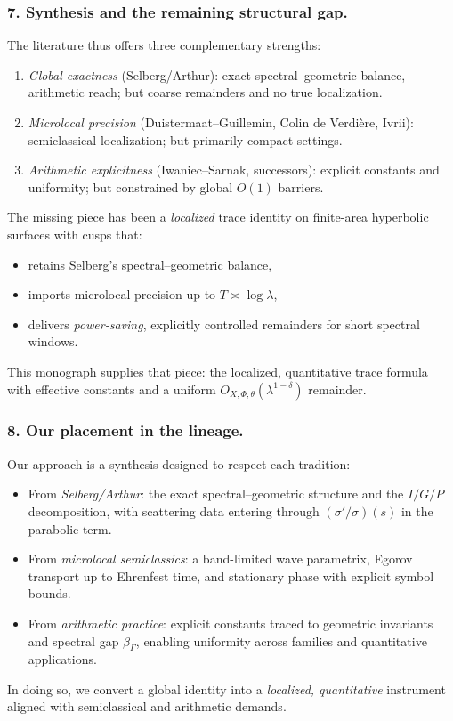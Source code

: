 \medskip

\subsubsection*{7. Synthesis and the remaining structural gap.}
The literature thus offers three complementary strengths:
\begin{enumerate}[label=\alph*)]
  \item \emph{Global exactness} (Selberg/Arthur): exact spectral–geometric balance, arithmetic reach; but coarse remainders and no true localization.
  \item \emph{Microlocal precision} (Duistermaat–Guillemin, Colin de Verdière, Ivrii): semiclassical localization; but primarily compact settings.
  \item \emph{Arithmetic explicitness} (Iwaniec–Sarnak, successors): explicit constants and uniformity; but constrained by global $O(1)$ barriers.
\end{enumerate}
The missing piece has been a \emph{localized} trace identity on finite-area hyperbolic surfaces with cusps that:
\begin{itemize}
  \item retains Selberg’s spectral–geometric balance,
  \item imports microlocal precision up to $T\asymp\log\lambda$,
  \item delivers \emph{power-saving}, explicitly controlled remainders for short spectral windows.
\end{itemize}
This monograph supplies that piece: the localized, quantitative trace formula with effective constants and a uniform
$O_{X,\Phi,\theta}(\lambda^{1-\delta})$ remainder.

\medskip

\subsubsection*{8. Our placement in the lineage.}
Our approach is a synthesis designed to respect each tradition:
\begin{itemize}
  \item From \emph{Selberg/Arthur}: the exact spectral–geometric structure and the $I/G/P$ decomposition, with scattering data
        entering through $(\sigma'/\sigma)(s)$ in the parabolic term.
  \item From \emph{microlocal semiclassics}: a band-limited wave parametrix, Egorov transport up to Ehrenfest time,
        and stationary phase with explicit symbol bounds.
  \item From \emph{arithmetic practice}: explicit constants traced to geometric invariants and spectral gap $\beta_\Gamma$,
        enabling uniformity across families and quantitative applications.
\end{itemize}
In doing so, we convert a global identity into a \emph{localized, quantitative} instrument aligned with semiclassical
and arithmetic demands.

